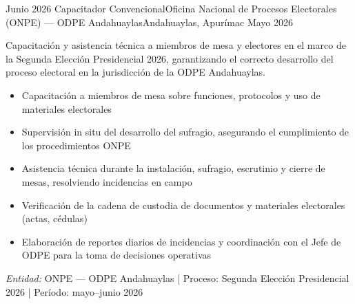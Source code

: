 \experience
{Junio 2026} {Capacitador Convencional}{Oficina Nacional de Procesos Electorales (ONPE) — ODPE Andahuaylas}{Andahuaylas, Apurímac}
{Mayo 2026} {
	Capacitación y asistencia técnica a miembros de mesa y electores en el marco de la Segunda Elección Presidencial 2026, garantizando el correcto desarrollo del proceso electoral en la jurisdicción de la ODPE Andahuaylas.
	\begin{itemize}
		\item Capacitación a miembros de mesa sobre funciones, protocolos y uso de materiales electorales
		\item Supervisión in situ del desarrollo del sufragio, asegurando el cumplimiento de los procedimientos ONPE
		\item Asistencia técnica durante la instalación, sufragio, escrutinio y cierre de mesas, resolviendo incidencias en campo
		\item Verificación de la cadena de custodia de documentos y materiales electorales (actas, cédulas)
		\item Elaboración de reportes diarios de incidencias y coordinación con el Jefe de ODPE para la toma de decisiones operativas
	\end{itemize}
}
{\footnotesize{\emph{Entidad:} ONPE — ODPE Andahuaylas | Proceso: Segunda Elección Presidencial 2026 | Período: mayo–junio 2026}}
